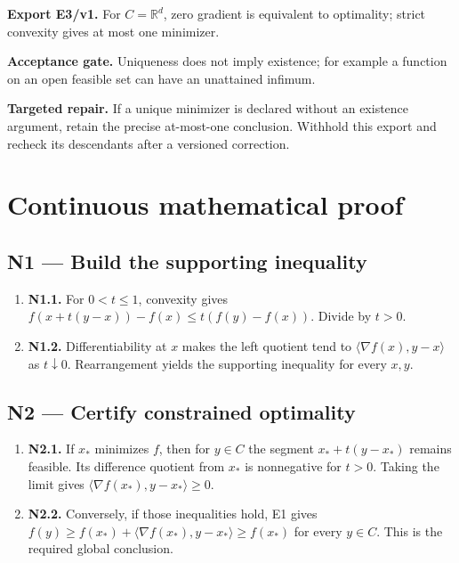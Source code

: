 \documentclass[preprint,12pt,aps,pra,showkeys,amsmath,amssymb,superscriptaddress,floatfix]{revtex4-2}
\theoremstyle{definition}
\theoremstyle{remark}
\newcommand{\field}[2]{\par\smallskip\noindent\textbf{#1.} #2\par}
\begin{document}
\field{Export E3/v1}{For \(C=\mathbb R^d\), zero gradient is equivalent to optimality; strict
convexity gives at most one minimizer.}

\field{Acceptance gate}{Uniqueness does not imply existence; for example a function on an open
feasible set can have an unattained infimum.}

\field{Targeted repair}{If a unique minimizer is declared without an existence argument, retain
the precise at-most-one conclusion. Withhold this export and recheck its
descendants after a versioned correction.}

\endgroup\clearpage\section{Continuous mathematical proof}\label{sec:proof}

\subsection{N1 --- Build the supporting
inequality}\label{n1-build-the-supporting-inequality}

\begin{enumerate}
\def\labelenumi{\arabic{enumi}.}
\item
  \textbf{N1.1.} For \(0<t\le1\), convexity gives
  \(f(x+t(y-x))-f(x)\le t(f(y)-f(x))\). Divide by \(t>0\).
\item
  \textbf{N1.2.} Differentiability at \(x\) makes the left quotient tend
  to \(\langle\nabla f(x),y-x\rangle\) as \(t\downarrow0\).
  Rearrangement yields the supporting inequality for every \(x,y\).
\end{enumerate}

\subsection{N2 --- Certify constrained
optimality}\label{n2-certify-constrained-optimality}

\begin{enumerate}
\def\labelenumi{\arabic{enumi}.}
\item
  \textbf{N2.1.} If \(x_*\) minimizes \(f\), then for \(y\in C\) the
  segment \(x_*+t(y-x_*)\) remains feasible. Its difference quotient
  from \(x_*\) is nonnegative for \(t>0\). Taking the limit gives
  \(\langle\nabla f(x_*),y-x_*\rangle\ge0\).
\item
  \textbf{N2.2.} Conversely, if those inequalities hold, E1 gives
  \(f(y)\ge f(x_*)+\langle\nabla f(x_*),y-x_*\rangle\ge f(x_*)\) for
  every \(y\in C\). This is the required global conclusion.
\end{enumerate}
\end{document}
